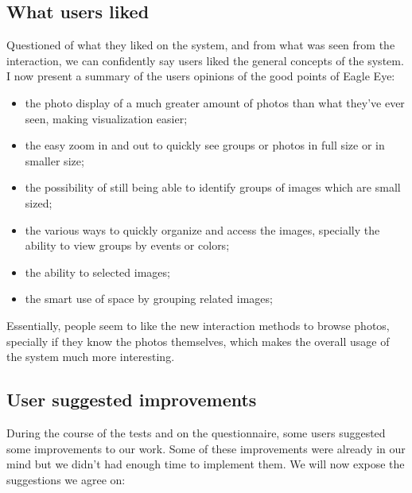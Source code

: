 \subsection{What users liked}

Questioned of what they liked on the system, and from what was seen from the interaction, we can confidently say users liked the general concepts of the system. I now present a summary of the users opinions of the good points of Eagle Eye:
\begin{itemize}
\item the photo display of a much greater amount of photos than what they've ever seen,  making visualization easier;
\item the easy zoom in and out to quickly see groups or photos in full size or in smaller size;
\item the possibility of still being able to identify groups of images which are small sized;
\item the various ways to quickly organize and access the images, specially the ability to view groups by events or colors;
\item the ability to selected images;
\item the smart use of space by grouping related images;
\end{itemize}

Essentially, people seem to like the new interaction methods to browse photos, specially if they know the photos themselves, which makes the overall usage of the system much more interesting.

\subsection{User suggested improvements}

During the course of the tests and on the questionnaire, some users suggested some improvements to our work. Some of these improvements were already in our mind but we didn't had enough time to implement them. We will now expose the suggestions we agree on:

